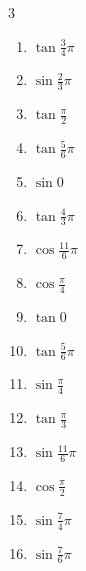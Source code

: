 \begin{multicols}{3}
\begin{enumerate}
  \item $\displaystyle \tan{\frac{3}{4}\pi}$
        \phantom{$\displaystyle =-1$}

  \item $\displaystyle \sin{\frac{2}{3}\pi}$

  \item $\displaystyle \tan{\frac{\pi}{2}}$
        \phantom{$\displaystyle \quad なし$}

  \item $\displaystyle \tan{\frac{5}{6}\pi}$

  \item $\displaystyle \sin{0}$
        \phantom{$\displaystyle =0$}

  \item $\displaystyle \tan{\frac{4}{3}\pi}$

  \item $\displaystyle \cos{\frac{11}{6}\pi}$

  \item $\displaystyle \cos{\frac{\pi}{4}}$

  \item $\displaystyle \tan{0}$
        \phantom{$\displaystyle =0$}

  \item $\displaystyle \tan{\frac{5}{6}\pi}$

  \item $\displaystyle \sin{\frac{\pi}{4}}$

  \item $\displaystyle \tan{\frac{\pi}{3}}$

  \item $\displaystyle \sin{\frac{11}{6}\pi}$

  \item $\displaystyle \cos{\frac{\pi}{2}}$
        \phantom{$\displaystyle =0$}

  \item $\displaystyle \sin{\frac{7}{4}\pi}$

  \item $\displaystyle \sin{\frac{7}{6}\pi}$


\end{enumerate}
\end{multicols}

